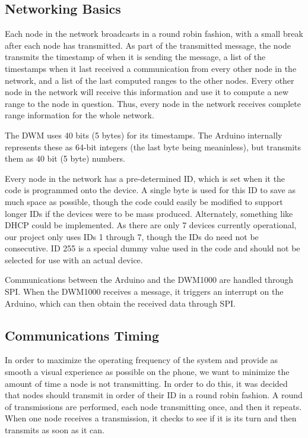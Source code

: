 \subsection{Networking Basics}
Each node in the network broadcasts in a round robin fashion, with a small break after each node has transmitted. As part of the transmitted message, the node transmits the timestamp of when it is sending the message, a list of the timestamps when it last received a communication from every other node in the network, and a list of the last computed ranges to the other nodes. Every other node in the network will receive this information and use it to compute a new range to the node in question. Thus, every node in the network receives complete range information for the whole network.

The DWM uses 40 bits (5 bytes) for its timestamps. The Arduino internally represents these as 64-bit integers (the last byte being meaninless), but transmits them as 40 bit (5 byte) numbers.

Every node in the network has a pre-determined ID, which is set when it the code is programmed onto the device. A single byte is used for this ID to save as much space as possible, though the code could easily be modified to support longer IDs if the devices were to be mass produced. Alternately, something like DHCP could be implemented. As there are only 7 devices currently operational, our project only uses IDs 1 through 7, though the IDs do need not be consecutive. ID 255 is a special dummy value used in the code and should not be selected for use with an actual device.

Communications between the Arduino and the DWM1000 are handled through SPI. When the DWM1000 receives a message, it triggers an interrupt on the Arduino, which can then obtain the received data through SPI.

\subsection{Communications Timing}
In order to maximize the operating frequency of the system and provide as smooth a visual experience as possible on the phone, we want to minimize the amount of time a node is not transmitting. In order to do this, it was decided that nodes should transmit in order of their ID in a round robin fashion. A round of transmissions are performed, each node transmitting once, and then it repeats. When one node receives a transmission, it checks to see if it is its turn and then transmits as soon as it can.

